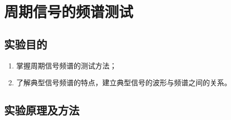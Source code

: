 \chapter{周期信号的频谱测试}%
\label{cha:周期信号的频谱测试}

\section{实验目的}%
\label{sec:实验目的\arabic{chapter}}

\begin{enumerate}
	\item 掌握周期信号频谱的测试方法；
	\item 了解典型信号频谱的特点，建立典型信号的波形与频谱之间的关系。
\end{enumerate}

\section{实验原理及方法}%
\label{sec:实验原理及方法\arabic{chapter}}

